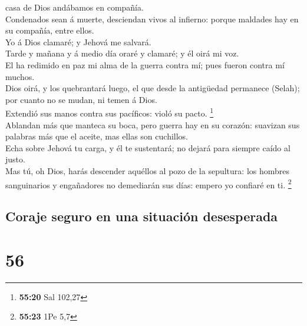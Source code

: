 casa de Dios andábamos en compañía.\\
 Condenados sean á muerte, desciendan vivos al infierno:
porque maldades hay en su compañía, entre ellos.\\
 Yo á Dios clamaré; y Jehová me salvará.\\
 Tarde y mañana y á medio día oraré y clamaré; y él oirá
mi voz.\\
 El ha redimido en paz mi alma de la guerra contra mí;
pues fueron contra mí muchos.\\
 Dios oirá, y los quebrantará luego, el que desde la
antigüedad permanece (Selah); por cuanto no se mudan, ni temen á Dios.\\
 Extendió sus manos contra sus pacíficos: violó su pacto.
\footnote{\textbf{55:20} Sal 102,27}\\
 Ablandan más que manteca su boca, pero guerra hay en su
corazón: suavizan sus palabras más que el aceite, mas ellas son
cuchillos.\\
 Echa sobre Jehová tu carga, y él te sustentará; no
dejará para siempre caído al justo.\\
 Mas tú, oh Dios, harás descender aquéllos al pozo de la
sepultura: los hombres sanguinarios y engañadores no demediarán sus
días: empero yo confiaré en ti. \footnote{\textbf{55:23} 1Pe 5,7}

\hypertarget{coraje-seguro-en-una-situaciuxf3n-desesperada}{%
\subsection{Coraje seguro en una situación
desesperada}\label{coraje-seguro-en-una-situaciuxf3n-desesperada}}

\hypertarget{section-55}{%
\section{56}\label{section-55}}

